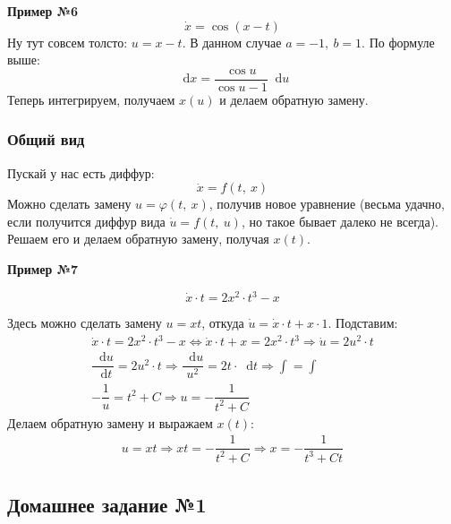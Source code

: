 \documentclass[a4paper,12pt]{article}
\renewcommand*\d{\mathop{}\!\mathrm{d}}
\newcommand{\du}{\dot{u}}
\newcommand{\dx}{\dot{x}}
\newcommand{\ds}{\displaystyle}
\begin{document}
\textbf{Пример №6}
\[\dx = \cos (x - t)\]
Ну тут совсем толсто: $u = x - t$. В данном случае $a = -1,\ b = 1$. По формуле выше:
\[\d x = \dfrac{\cos u}{\cos u - 1}\d u\]
Теперь интегрируем, получаем $x(u)$ и делаем обратную замену.

\subsubsection{Общий вид}

Пускай у нас есть диффур:
\[\dx = f(t,\ x)\]
Можно сделать замену $u = \varphi(t,\ x)$, получив новое уравнение (весьма удачно, если получится диффур вида $\du = f(t,\ u)$, но такое бывает далеко не всегда). Решаем его и делаем обратную замену, получая $x(t)$.

\textbf{Пример №7}

\[\dx \cdot t = 2x^2 \cdot t^3 - x\]

Здесь можно сделать замену $u = xt$, откуда $\du = \dx \cdot t + x \cdot 1$. Подставим:
\begin{gather*}
	\dx \cdot t = 2x^2 \cdot t^3 - x \iff \dx \cdot t + x = 2x^2 \cdot t^3 \Longrightarrow \du = 2u^2 \cdot t \\
	\dfrac{\d u}{\d t} = 2u^2 \cdot t \Longrightarrow \dfrac{\d u}{u^2} = 2t \cdot \d t \Longrightarrow \ds\int = \int\\
	-\dfrac{1}{u} = t^2 + C \Longrightarrow u = -\dfrac{1}{t^2 + C}
\end{gather*}
Делаем обратную замену и выражаем $x(t)$:
\begin{gather*}
	u = xt \Longrightarrow xt = -\dfrac{1}{t^2 + C} \Longrightarrow x = -\dfrac{1}{t^3 + Ct}
\end{gather*}

\subsection{Домашнее задание №1}
\end{document}
